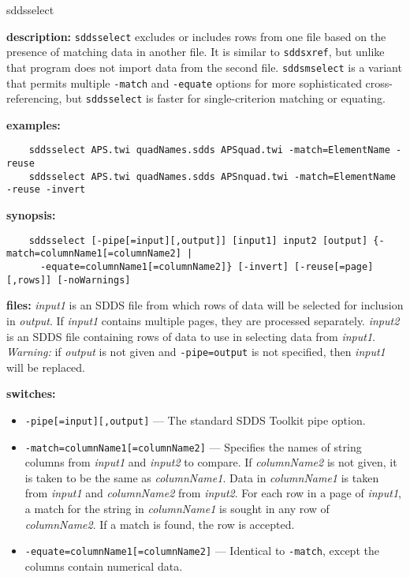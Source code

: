 \begin{sddsprog}{sddsselect}
  \item \textbf{description:} \verb|sddsselect| excludes or includes rows from one file based on the presence of matching data in another file. It is similar to \verb|sddsxref|, but unlike that program does not import data from the second file. \verb|sddsmselect| is a variant that permits multiple \verb|-match| and \verb|-equate| options for more sophisticated cross-referencing, but \verb|sddsselect| is faster for single-criterion matching or equating.
  \item \textbf{examples:}
    \begin{verbatim}
    sddsselect APS.twi quadNames.sdds APSquad.twi -match=ElementName -reuse
    sddsselect APS.twi quadNames.sdds APSnquad.twi -match=ElementName -reuse -invert
    \end{verbatim}
  \item \textbf{synopsis:}
    \begin{verbatim}
    sddsselect [-pipe[=input][,output]] [input1] input2 [output] {-match=columnName1[=columnName2] |
      -equate=columnName1[=columnName2]} [-invert] [-reuse[=page][,rows]] [-noWarnings]
    \end{verbatim}
  \item \textbf{files:} \emph{input1} is an SDDS file from which rows of data will be selected for inclusion in \emph{output}. If \emph{input1} contains multiple pages, they are processed separately. \emph{input2} is an SDDS file containing rows of data to use in selecting data from \emph{input1}. \emph{Warning:} if \emph{output} is not given and \verb|-pipe=output| is not specified, then \emph{input1} will be replaced.
  \item \textbf{switches:}
    \begin{itemize}
      \item \verb|-pipe[=input][,output]| --- The standard SDDS Toolkit pipe option.
      \item \verb|-match=columnName1[=columnName2]| --- Specifies the names of string columns from \emph{input1} and \emph{input2} to compare. If \emph{columnName2} is not given, it is taken to be the same as \emph{columnName1}. Data in \emph{columnName1} is taken from \emph{input1} and \emph{columnName2} from \emph{input2}. For each row in a page of \emph{input1}, a match for the string in \emph{columnName1} is sought in any row of \emph{columnName2}. If a match is found, the row is accepted.
      \item \verb|-equate=columnName1[=columnName2]| --- Identical to \verb|-match|, except the columns contain numerical data.

\end{itemize}
\end{sddsprog}
